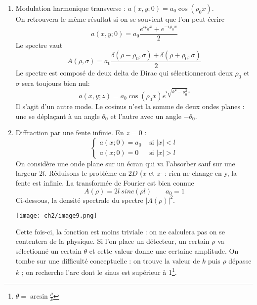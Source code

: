 \begin{enumerate}
\item Modulation harmonique transverse : $a(x,y;0) = a_0\cos(\rho_0x)$.\\
On retrouvera le même résultat si on se souvient que l'on peut écrire
\begin{equation}
a(x,y;0) = a_0\frac{e^{i\rho_0x}+e^{-i\rho_0x}}{2}
\end{equation}
Le spectre vaut
\begin{equation}
A(\rho,\sigma) = a_0\frac{\delta(\rho-\rho_0,\sigma)+\delta(\rho+\rho_0,\sigma)}{2}
\end{equation}
Le spectre est composé de deux delta de Dirac qui sélectionneront deux $\rho_0$ et 
$\sigma$ sera toujours bien nul:
\begin{equation}
a(x,y;z) = a_0\cos(\rho_0x)e^{i\sqrt{k^2-\rho_0^2}z}
\end{equation}
Il s'agit d'un autre mode. Le cosinus n'est la somme de deux ondes planes : une se 
déplaçant à un angle $\theta_0$ et l'autre avec un angle $-\theta_0$.

\item Diffraction par une fente infinie. En $z=0$ :
\begin{equation}
\left\{\begin{array}{ll}
a(x;0) = a_0 & \text{ si } |x| < l\\
a(x;0) = 0 & \text{ si } |x| > l
\end{array}\right.
\end{equation}
On considère une onde plane sur un écran qui va l'absorber sauf sur une largeur $2l$. 
Réduisons le problème en $2D$ ($x$ et $z$- : rien ne change en y, la fente est infinie.  
La transformée de Fourier est bien connue
\begin{equation}
A(\rho) = 2l\ sinc(\rho l)\qquad a_0=1
\end{equation}
Ci-dessous, la densité spectrale du spectre $|A(\rho)|^2$. 
\begin{center}
\texttt{[image: ch2/image9.png]}
\end{center}
Cette fois-ci, la fonction est 
moins triviale : on ne calculera pas on se contentera de la physique. Si l'on place un 
détecteur, un certain $\rho$ va sélectionné un certain $\theta$ et cette valeur donne une 
certaine amplitude. On tombe sur une difficulté conceptuelle : on trouve la valeur de $k$ 
puis $\rho$ dépasse $k$ ; on recherche l'arc dont le sinus est supérieur à 1\footnote{$\theta =
\arcsin\frac{\rho}{k}$}.\\


\end{enumerate}
